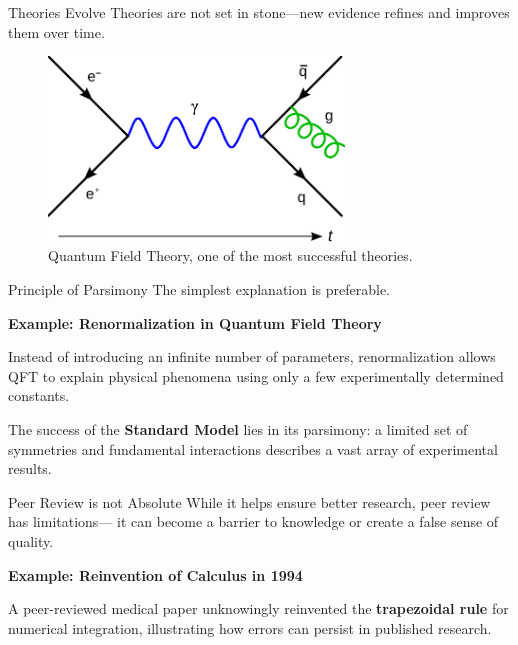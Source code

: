 \begin{frame}{Theories Evolve}
  Theories are not set in stone—new evidence refines and improves them 
  over time.

  \vspace{0.5cm}

  \begin{figure}
    \centering
    \includegraphics[width=0.7\textwidth]{Figures/Feynmann_Diagram_Gluon_Radiation.pdf}
    \caption{Quantum Field Theory, one of the most successful theories. 
    \cite{Holdsworth2007}}
  \end{figure}
\end{frame}

\begin{frame}{Principle of Parsimony}
  The simplest explanation is preferable.

  \vspace{0.5cm}
  \textbf{Example: Renormalization in Quantum Field Theory}

  Instead of introducing an infinite number of parameters, 
  renormalization allows QFT to explain physical phenomena using 
  only a few experimentally determined constants. 

  \vspace{0.5cm}
  The success of the \textbf{Standard Model} lies in its parsimony: 
  a limited set of symmetries and fundamental interactions describes 
  a vast array of experimental results.
\end{frame}

\begin{frame}{Peer Review is not Absolute}
  While it helps ensure better research, peer review has limitations—
  it can become a barrier to knowledge or create a false sense of quality.

  \vspace{0.5cm}
  \textbf{Example: Reinvention of Calculus in 1994}

  A peer-reviewed medical paper unknowingly reinvented the 
  \textbf{trapezoidal rule} for numerical integration, illustrating how 
  errors can persist in published research. \cite{Tai1994}
\end{frame}


